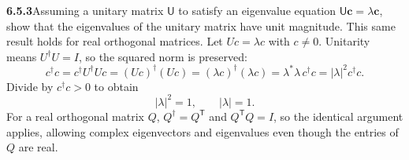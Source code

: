 \par\bigskip
\noindent\textbf{6.5.3}\quad Assuming a unitary matrix $\mathsf{U}$ to satisfy
an eigenvalue equation $\mathsf{U}\mathbf{c}=\lambda\mathbf{c}$, show that the
eigenvalues of the unitary matrix have unit magnitude. This same result holds
for real orthogonal matrices.
\solution
Let $Uc=\lambda c$ with $c\ne0$. Unitarity means
$U^\dagger U=I$, so the squared norm is preserved:
\[
c^\dagger c=c^\dagger U^\dagger Uc=(Uc)^\dagger(Uc)
=(\lambda c)^\dagger(\lambda c)
=\lambda^*\lambda\,c^\dagger c=|\lambda|^2c^\dagger c.
\]
Divide by $c^\dagger c>0$ to obtain
\[
\boxed{|\lambda|^2=1,\qquad |\lambda|=1.}
\]
For a real orthogonal matrix $Q$, $Q^\dagger=Q^{\mathsf T}$ and
$Q^{\mathsf T}Q=I$, so the identical argument applies, allowing complex
eigenvectors and eigenvalues even though the entries of $Q$ are real.

